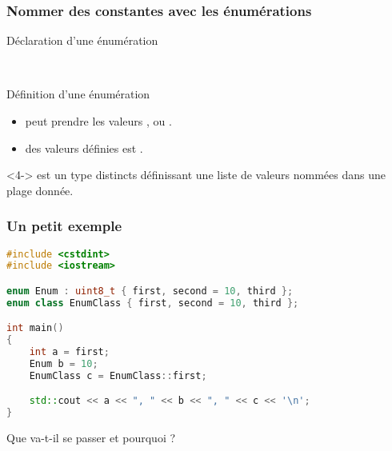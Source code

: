 \documentclass{cppcourses}
\begin{document}
\begin{frame}

\frametitle{Nommer des constantes avec les énumérations}

\begin{myfigure}
\caption{Déclaration d'une énumération}
\end{myfigure}

\begin{myfigure}
 \\
\caption{Définition d'une énumération}
\end{myfigure}

\begin{itemize}
    \item<2->  peut prendre les valeurs ,  ou .
    \item<3->  des valeurs définies est \mykeyword{\textcolor{orange}{<base>}}.
\end{itemize}

\begin{definition}<4->
 est un type distincts définissant une liste de valeurs nommées dans une plage donnée.
\end{definition}

\end{frame}

\begin{frame}[fragile]

\frametitle{Un petit exemple}

\begin{example}

\begin{lstlisting}[language = c++]
#include <cstdint>
#include <iostream>

enum Enum : uint8_t { first, second = 10, third };
enum class EnumClass { first, second = 10, third };

int main()
{
    int a = first;
    Enum b = 10;
    EnumClass c = EnumClass::first;

    std::cout << a << ", " << b << ", " << c << '\n';
}
\end{lstlisting}

Que va-t-il se passer et pourquoi ?

\end{example}

\end{frame}

\mybye
\end{document}
